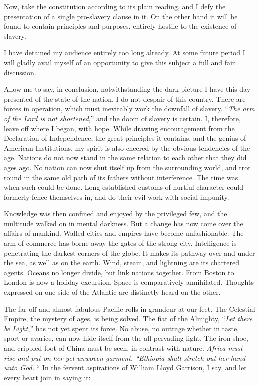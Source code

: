 Now, take the constitution according to its plain reading, and I defy the presentation of a single pro-slavery clause in it. On the other hand it will be found to contain principles and purposes, entirely hostile to the existence of slavery.\par

I have detained my audience entirely too long already. At some future period I will gladly avail myself of an opportunity to give this subject a full and fair discussion.\par

Allow me to say, in conclusion, notwithstanding the dark picture I have this day presented of the state of the nation, I do not despair of this country. There are forces in operation, which must inevitably work the downfall of slavery. “\textit{The arm of the Lord is not shortened},” and the doom of slavery is certain. I, therefore, leave off where I began, with hope. While drawing encouragement from the Declaration of Independence, the great principles it contains, and the genius of American Institutions, my spirit is also cheered by the obvious tendencies of the age. Nations do not now stand in the same relation to each other that they did ages ago. No nation can now shut itself up from the surrounding world, and trot round in the same old path of its fathers without interference. The time was when such could be done. Long established customs of hurtful character could formerly fence themselves in, and do their evil work with social impunity.\par

Knowledge was then confined and enjoyed by the privileged few, and the multitude walked on in mental darkness. But a change has now come over the affairs of mankind. Walled cities and empires have become unfashionable. The arm of commerce has borne away the gates of the strong city. Intelligence is penetrating the darkest corners of the globe. It makes its pathway over and under the sea, as well as on the earth. Wind, steam, and lightning are its chartered agents. Oceans no longer divide, but link nations together. From Boston to London is now a holiday excursion. Space is comparatively annihilated. Thoughts expressed on one side of the Atlantic are distinctly heard on the other.\par

The far off and almost fabulous Pacific rolls in grandeur at our feet. The Celestial Empire, the mystery of ages, is being solved. The fiat of the Almighty, “\textit{Let there be Light},” has not yet spent its force. No abuse, no outrage whether in taste, sport or avarice, can now hide itself from the all-pervading light. The iron shoe, and crippled foot of China must be seen, in contrast with nature. \textit{Africa must rise and put on her yet unwoven garment. “Ethiopia shall stretch out her hand unto God. }“ In the fervent aspirations of William Lloyd Garrison, I say, and let every heart join in saying it:\par

